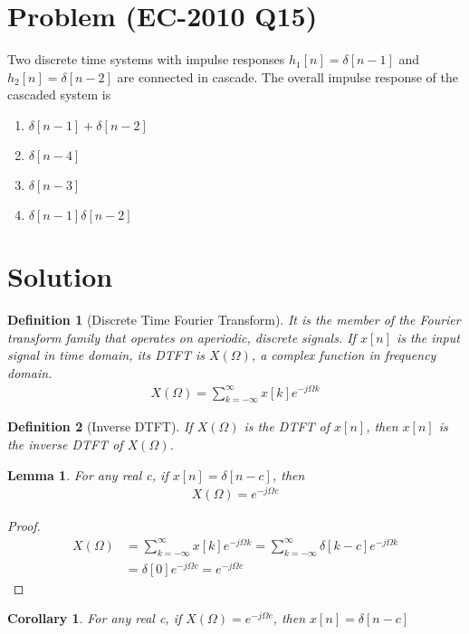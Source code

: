 \documentclass[journal,12pt,twocolumn]{IEEEtran}
\newtheorem{corollary}{Corollary}[theorem]
\newtheorem{lemma}[theorem]{Lemma}
\newtheorem{definition}{Definition}[section]
\begin{document}
\section{Problem (EC-2010 Q15)}
Two discrete time systems with impulse responses $h_1[n]=\delta[n-1]$ and $h_2[n]=\delta[n-2]$ are connected in cascade. The overall impulse response of the cascaded system is
\begin{enumerate}
    \item $\delta[n-1]+\delta[n-2]$
    \item $\delta[n-4]$
    \item $\delta[n-3]$
    \item $\delta[n-1]\delta[n-2]$
\end{enumerate}
\section{Solution}
\begin{definition}[Discrete Time Fourier Transform]
It is the member of the Fourier transform family that operates on aperiodic, discrete signals. If $x[n]$ is the input signal in time domain, its DTFT is $X(\Omega)$, a complex function in frequency domain.
\begin{align}
    X(\Omega)=\displaystyle\sum_{k=-\infty}^{\infty}x[k]e^{-j\Omega k} 
\end{align}
\end{definition}
\begin{definition}[Inverse DTFT]
If $X(\Omega)$ is the DTFT of $x[n]$, then $x[n]$ is the inverse DTFT of $X(\Omega)$.
\end{definition}
\begin{lemma}
For any real c, if $x[n]=\delta[n-c]$, then
\begin{align}
    X(\Omega)=e^{-j\Omega c}
    \label{eq:delta}
\end{align}
\end{lemma}
\begin{proof}
\begin{align}
     X(\Omega)&=\displaystyle\sum_{k=-\infty}^{\infty}x[k]e^{-j\Omega k}=\displaystyle\sum_{k=-\infty}^{\infty}\delta[k-c]e^{-j\Omega k}\\
     &=\delta[0]e^{-j\Omega c}=e^{-j\Omega c}
\end{align}
\end{proof}
\begin{corollary}
For any real c, if $X(\Omega)=e^{-j\Omega c}$, then $x[n]=\delta[n-c]$
\end{corollary}
\end{document}
